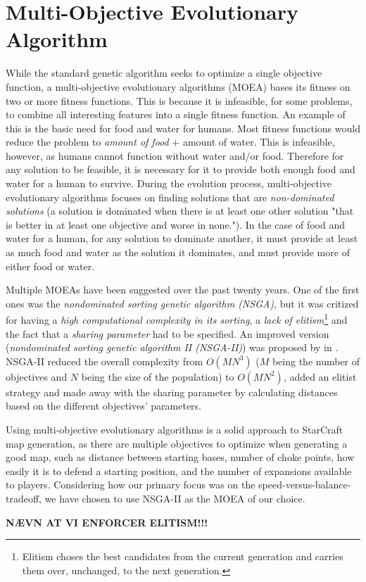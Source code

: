 \section{Multi-Objective Evolutionary Algorithm}
\label{methodology_moea}
While the standard genetic algorithm seeks to optimize a single objective function, a multi-objective evolutionary algorithms (MOEA) bases its fitness on two or more fitness functions. This is because it is infeasible, for some problems, to combine all interesting features into a single fitness function. An example of this is the basic need for food and water for humans. Most fitness functions would reduce the problem to \textit{amount of food} + {amount of water}. This is infeasible, however, as humans cannot function without water and/or food. Therefore for any solution to be feasible, it is necessary for it to provide both enough food and water for a human to survive. During the evolution process, multi-objective evolutionary algorithms focuses on finding solutions that are \textit{non-dominated solutions} (a solution is dominated when there is at least one other solution "that is better in at least one objective and worse in none."\cite{Togelius2013Controllable}). In the case of food and water for a human, for any solution to dominate another, it must provide at least as much food and water as the solution it dominates, and must provide more of either food or water.

Multiple MOEAs have been suggested over the past twenty years\cite{Deb2001Multi, Fonseca1993Genetic, Srinivas1994Muiltiobjective}. One of the first ones was the \textit{nondominated sorting genetic algorithm (NSGA)}\cite{Srinivas1994Muiltiobjective}, but it was critized for having a \textit{high computational complexity in its sorting}, a \textit{lack of elitism}\footnote{Elitism choses the best candidates from the current generation and carries them over, unchanged, to the next generation.} and the fact that a \textit{sharing parameter} had to be specified. An improved version (\textit{nondominated sorting genetic algorithm II (NSGA-II)}) was proposed by \citeauthor{Deb2000Fast}\cite{Deb2000Fast} in \citeyear{Deb2000Fast}. NSGA-II reduced the overall complexity from $O(M N^3)$ ($M$ being the number of objectives and $N$ being the size of the population) to $O(M N^2)$, added an elitist strategy and made away with the sharing parameter by calculating distances based on the different objectives' parameters.

Using multi-objective evolutionary algorithms is a solid approach to StarCraft map generation, as there are multiple objectives to optimize when generating a good map, such as distance between starting bases, number of choke points, how easily it is to defend a starting position, and the number of expansions available to players. Considering how our primary focus was on the speed-versus-balance-tradeoff, we have chosen to use NSGA-II as the MOEA of our choice.

\textbf{NÆVN AT VI ENFORCER ELITISM!!!}